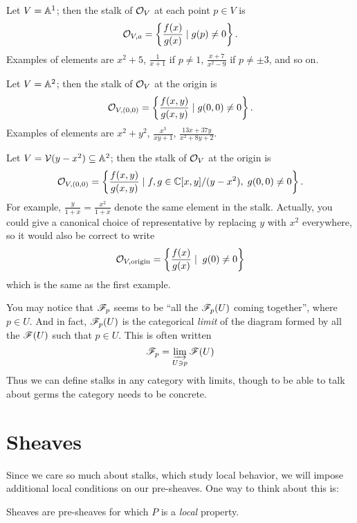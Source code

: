 \begin{example}
	\listhack
	\begin{enumerate}[(a)]
		\ii Let $V = \mathbb A^1$; then the stalk of $\mathcal O_V$
		at each point $p \in V$ is
		\[ \mathcal O_{V,a}
			= \left\{ \frac{f(x)}{g(x)} \mid g(p) \ne 0 \right\}. \]
		Examples of elements are $x^2+5$, $\frac{1}{x+1}$ if $p \ne 1$,
		$\frac{x+7}{x^2-9}$ if $p \ne \pm 3$, and so on.

		\ii Let $V = \mathbb A^2$;
		then the stalk of $\mathcal O_V$ at the origin is
		\[ \mathcal O_{V, (0,0)}
			= \left\{ \frac{f(x,y)}{g(x,y)} \mid g(0,0) \ne 0 \right\}. \]
		Examples of elements are $x^2+y^2$,
		$\frac{x^3}{xy+1}$, $\frac{13x+37y}{x^2+8y+2}$.

		\ii Let $V = \mathcal V(y-x^2) \subseteq \mathbb A^2$;
		then the stalk of $\mathcal O_V$ at the origin is
		\[ \mathcal O_{V, (0,0)}
			= \left\{ \frac{f(x,y)}{g(x,y)} \mid f,g \in \mathbb C[x,y] / (y-x^2),
				\; g(0,0) \ne 0 \right\}. \]
		For example, $\frac{y}{1+x} = \frac{x^2}{1+x}$ denote the same element
		in the stalk.
		Actually, you could give a canonical choice of representative
		by replacing $y$ with $x^2$ everywhere, so it would also be
		correct to write
		\[ \mathcal O_{V, \text{origin}}
			= \left\{ \frac{f(x)}{g(x)} \mid \; g(0) \ne 0 \right\} \]
		which is the same as the first example.
	\end{enumerate}
\end{example}

\begin{remark}
	You may notice that $\mathscr F_p$ seems to be
	``all the $\mathscr F_p(U)$ coming together'', where $p \in U$.
	And in fact, $\mathscr F_p(U)$ is the categorical \emph{limit}
	of the diagram formed by all the $\mathscr F(U)$ such that $p \in U$.
	This is often written
	\[ \mathscr F_p = \varinjlim_{U \ni p} \mathscr F(U) \]
	Thus we can define stalks in any category with limits,
	though to be able to talk about germs the category needs
	to be concrete.
\end{remark}

\section{Sheaves}

Since we care so much about stalks, which study local behavior,
we will impose additional local conditions on our pre-sheaves.
One way to think about this is:
\begin{moral}
	Sheaves are pre-sheaves for which $P$ is a \emph{local} property.
\end{moral}

